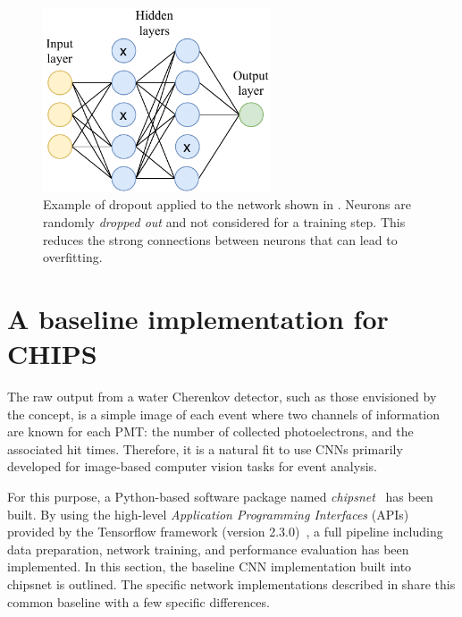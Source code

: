 \begin{figure} %
    \includegraphics[width=0.6\textwidth]{diagrams/6-cnn/dropout.pdf}
    \caption[Example of dropout applied to a neural network]
    {Example of dropout applied to the network shown in . Neurons are
        randomly \emph{dropped out} and not considered for a training step. This reduces the
        strong connections between neurons that can lead to overfitting.}
    \label{fig:dropout}
\end{figure}

\section{A baseline implementation for CHIPS} %
\label{sec:cnn_baseline} %

The raw output from a water Cherenkov detector, such as those envisioned by the \chips concept, is
a simple image of each event where two channels of information are known for each PMT: the number
of collected photoelectrons, and the associated hit times. Therefore, it is a natural fit to use
CNNs primarily developed for image-based computer vision tasks for \chips event analysis.

For this purpose, a Python-based software package named \emph{chipsnet}~\cite{chipsnet2020} has
been built. By using the high-level \emph{Application Programming Interfaces} (APIs) provided by
the Tensorflow framework (version 2.3.0)~\cite{tf2015}, a full pipeline including data
preparation, network training, and performance evaluation has been implemented. In this section,
the baseline CNN implementation built into chipsnet is outlined. The specific network
implementations described in  share this common baseline with a few
specific differences.

